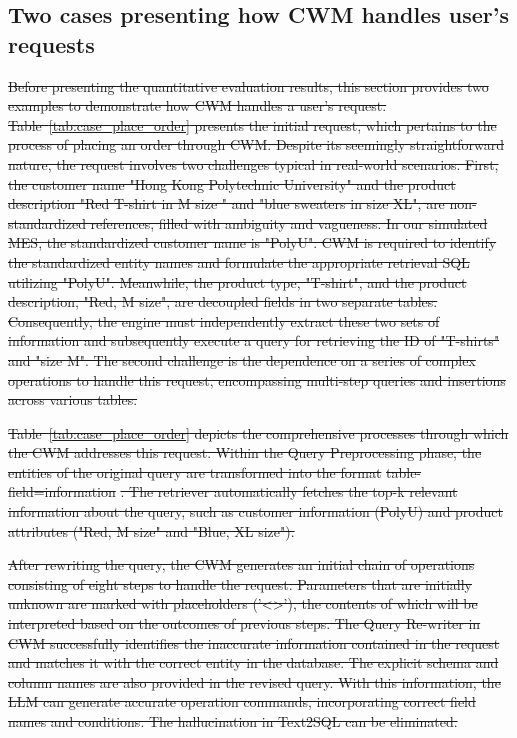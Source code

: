 \documentclass[preprint,12pt]{elsarticle}
\providecommand{\DIFdeltex}[1]{{\protect\color{red}\sout{#1}}}                      %
\providecommand{\DIFdelbegin}{} %
\providecommand{\DIFdel}[1]{\texorpdfstring{\DIFdeltex{#1}}{}} %
\newcommand{\DIFscaledelfig}{0.5}
\newlength{\DIFdelgraphicswidth} %
\newlength{\DIFdelgraphicsheight} %
\newcommand{\DIFdelincludegraphics}[2][]{%
\sbox{\DIFdelgraphicsbox}{\DIFOincludegraphics[#1]{#2}}%
\settoboxwidth{\DIFdelgraphicswidth}{\DIFdelgraphicsbox} %
\settoboxtotalheight{\DIFdelgraphicsheight}{\DIFdelgraphicsbox} %
\scalebox{\DIFscaledelfig}{%
\parbox[b]{\DIFdelgraphicswidth}{\usebox{\DIFdelgraphicsbox}\\[-\baselineskip] \rule{\DIFdelgraphicswidth}{0em}}\llap{\resizebox{\DIFdelgraphicswidth}{\DIFdelgraphicsheight}{%
\setlength{\unitlength}{\DIFdelgraphicswidth}%
\begin{picture}(1,1)%
\thicklines\linethickness{2pt} %
{\color[rgb]{1,0,0}\put(0,0){\framebox(1,1){}}}%
{\color[rgb]{1,0,0}\put(0,0){\line( 1,1){1}}}%
{\color[rgb]{1,0,0}\put(0,1){\line(1,-1){1}}}%
\end{picture}%
}\hspace*{3pt}}} %
} %
\DeclareRobustCommand{\DIFdelbegin}{\DIFOdelbegin \let\includegraphics\DIFdelincludegraphics} %
\begin{document}
\subsection{Two cases presenting how CWM handles user's requests}
\label{sec:exp_cases}
\DIFdelbegin \DIFdel{Before presenting the quantitative evaluation results, this section provides two examples to demonstrate how CWM handles a user's request.
Table~\ref{tab:case_place_order} presents the initial request, which pertains to the process of placing an order through CWM. Despite its seemingly straightforward nature, the request involves two challenges typical in real-world scenarios.
First, the customer name "Hong Kong Polytechnic University" and the product description "Red T-shirt in M size " and "blue sweaters in size XL", are non-standardized references, filled with ambiguity and vagueness.
In our simulated MES, the standardized customer name is "PolyU".
CWM is required to identify the standardized entity names and formulate the appropriate retrieval SQL utilizing "PolyU". 
Meanwhile, the product type, "T-shirt", and the product description, "Red, M size", are decoupled fields in two separate tables.
Consequently, the engine must independently extract these two sets of information and subsequently execute a query for retrieving the ID of "T-shirts" and "size M".
The second challenge is the dependence on a series of complex operations to handle this request, encompassing multi-step queries and insertions across various tables.
}%

\DIFdel{Table~\ref{tab:case_place_order} depicts the comprehensive processes through which the CWM addresses this request. 
Within the Query Preprocessing phase, the entities of the original query are transformed into the format }%
\DIFdel{table-field=information}%
\DIFdel{. 
The retriever automatically fetches the top-k relevant information about the query, such as customer information (PolyU) and product attributes ("Red, M size" and "Blue, XL size"). 
}%

\DIFdel{After rewriting the query, the CWM generates an initial chain of operations consisting of eight steps to handle the request. 
Parameters that are initially unknown are marked with placeholders ('<>'), the contents of which will be interpreted based on the outcomes of previous steps.
The Query Re-writer in CWM successfully identifies the inaccurate information contained in the request and matches it with the correct entity in the database. 
The explicit schema and column names are also provided in the revised query.
With this information, the LLM can generate accurate operation commands, incorporating correct field names and conditions.
The hallucination in Text2SQL can be eliminated.
}%
\end{document}
